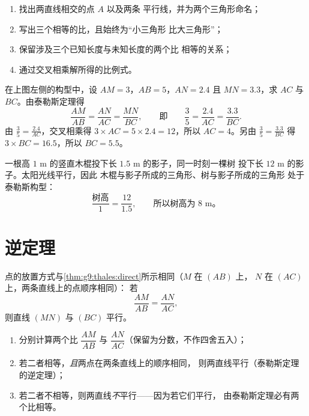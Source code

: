 \begin{method}[用泰勒斯定理计算长度]\label{met:g9:thales:compute}
\begin{enumerate}
  \item 找出两直线相交的点 $A$ 以及两条
        平行线，并为两个三角形命名；
  \item 写出三个相等的比，且始终为“小三角形
        比大三角形”；
  \item 保留涉及三个已知长度与未知长度的两个比
        相等的关系；
  \item 通过交叉相乘解所得的比例式。
\end{enumerate}
\end{method}

\begin{example}\label{ex:g9:thales:compute}
在上图左侧的构型中，设 $AM = 3$，$AB = 5$，$AN = 2.4$
且 $MN = 3.3$，求 $AC$ 与 $BC$。由泰勒斯定理得
\[
\frac{AM}{AB} = \frac{AN}{AC} = \frac{MN}{BC},
\qquad\text{即}\qquad
\frac35 = \frac{2.4}{AC} = \frac{3.3}{BC}.
\]
由 $\frac35 = \frac{2.4}{AC}$，交叉相乘得
$3 \times AC = 5 \times 2.4 = 12$，所以 $AC = 4$。另由
$\frac35 = \frac{3.3}{BC}$ 得 $3 \times BC = 16.5$，所以 $BC = 5.5$。
\end{example}

\begin{example}[生活中的泰勒斯定理]\label{ex:g9:thales:stick}
一根高 $1$ m 的竖直木棍投下长 $1.5$ m 的影子，同一时刻一棵树
投下长 $12$ m 的影子。太阳光线平行，因此
木棍与影子所成的三角形、树与影子所成的三角形
处于泰勒斯构型：
\[
\frac{\text{树高}}{1} = \frac{12}{1.5},
\qquad\text{所以树高为 } 8 \text{ m。}
\]
\end{example}

\section{逆定理}

\begin{theorem}[泰勒斯定理的逆定理]\label{thm:g9:thales:converse}
点的放置方式与\cref{thm:g9:thales:direct}所示相同（$M$ 在 $(AB)$ 上，
$N$ 在 $(AC)$ 上，两条直线上的点顺序相同）：
若
\[
\frac{AM}{AB} = \frac{AN}{AC},
\]
则直线 $(MN)$ 与 $(BC)$ 平行。
\end{theorem}
\admitted

\begin{method}[证明或否定平行关系]\label{met:g9:thales:converse}
\begin{enumerate}
  \item 分别计算两个比 $\dfrac{AM}{AB}$ 与
        $\dfrac{AN}{AC}$（保留为分数，不作四舍五入）；
  \item 若二者相等，\emph{且}两点在两条直线上的顺序相同，
        则两直线平行（泰勒斯定理的逆定理）；
  \item 若二者不相等，则两直线\emph{不}平行——因为若它们平行，
        由泰勒斯定理必有两个比相等。
\end{enumerate}
\end{method}

